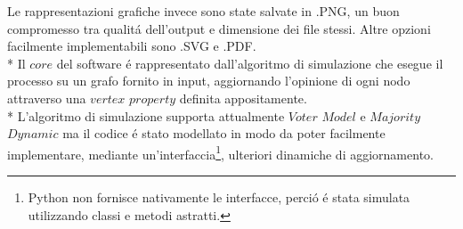 \documentclass[../Tesi.tex]{subfiles}
\begin{document}
Le rappresentazioni grafiche invece sono state salvate in .PNG, un buon compromesso tra qualit\'a dell'output e dimensione dei file stessi. Altre opzioni facilmente implementabili sono .SVG e .PDF.\\*
Il $core$ del software \'e rappresentato dall'algoritmo di simulazione che esegue il processo su un grafo fornito in input, aggiornando l'opinione di ogni nodo attraverso una $vertex$ $property$ definita appositamente.\\*
L'algoritmo di simulazione supporta attualmente $Voter$ $Model$ e $Majority$ $Dynamic$ ma il codice \'e stato modellato in modo da poter facilmente implementare, mediante un'interfaccia\footnote{Python non fornisce nativamente le interfacce, perci\'o \'e stata simulata utilizzando classi e metodi astratti.}, ulteriori dinamiche di aggiornamento.
\end{document}
